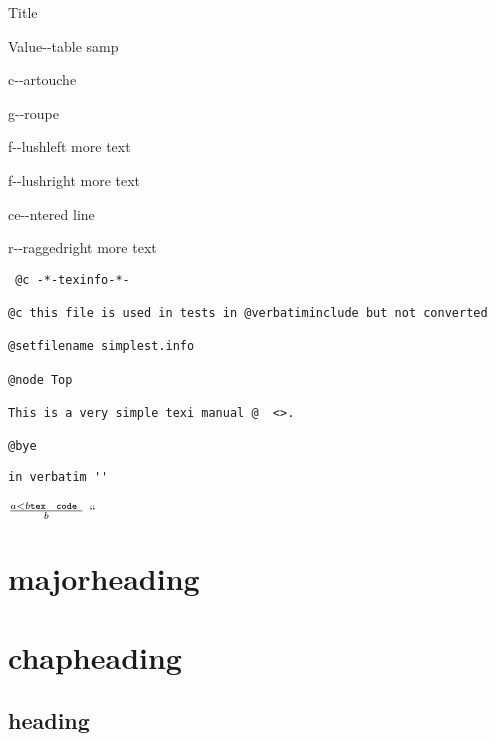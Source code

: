 \documentclass{book}
\newcommand\GNUTexinfotablestylesamp[1]{\ifstrempty{#1}{}{`\texttt{#1}'}}%
\newcommand{\GNUTexinfoplaceholder}[1]{}
\newcommand{\GNUTexinfonopagebreakheading}[2]{\let\clearpage\relax \let\cleardoublepage\relax \let\thispagestyle\GNUTexinfoplaceholder #1{#2}}
\begin{document}
\begin{description}[format=\GNUTexinfotablestylesamp]
\item[] Title
\item[a{-}{-}samp]
\item[a2{-}{-}samp]
Value{-}{-}table samp
\end{description}

\begin{mdframed}[style=GNUTexinfocartouche]
c{-}{-}artouche
\end{mdframed}

g{-}{-}roupe

f{-}{-}lushleft
more text

f{-}{-}lushright
more text

\begin{center}
ce{-}{-}ntered line
\end{center}

\begin{flushleft}
r{-}{-}raggedright
more text
\end{flushleft}

\begin{verbatim}
 @c -*-texinfo-*-

@c this file is used in tests in @verbatiminclude but not converted

@setfilename simplest.info

@node Top

This is a very simple texi manual @  <>.

@bye
\end{verbatim}

\begin{verbatim}
in verbatim ''
\end{verbatim}





$\frac{a < b \texttt{tex \hbox{ code }}}{b}$ ``

\GNUTexinfonopagebreakheading{\chapter*}{majorheading}

\GNUTexinfonopagebreakheading{\chapter*}{chapheading}

\GNUTexinfonopagebreakheading{\section*}{heading}
\end{document}
